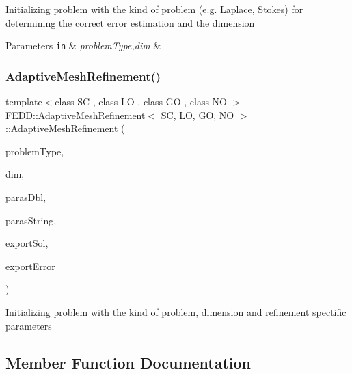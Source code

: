 Initializing problem with the kind of problem (e.\+g. Laplace, Stokes) for determining the correct error estimation and the dimension 
\begin{DoxyParams}[1]{Parameters}
\mbox{\tt in}  & {\em problem\+Type,dim} & \\
\hline
\end{DoxyParams}
\mbox{\label{classFEDD_1_1AdaptiveMeshRefinement_afbfd75b4f7579382147c6ca96f14b3b0}} 
\subsubsection{\texorpdfstring{Adaptive\+Mesh\+Refinement()}{AdaptiveMeshRefinement()}\hspace{0.1cm}{\footnotesize\ttfamily [4/4]}}
{\footnotesize\ttfamily template$<$class SC , class LO , class GO , class NO $>$ \\
\hyperlink{classFEDD_1_1AdaptiveMeshRefinement}{F\+E\+D\+D\+::\+Adaptive\+Mesh\+Refinement}$<$ SC, LO, GO, NO $>$\+::\hyperlink{classFEDD_1_1AdaptiveMeshRefinement}{Adaptive\+Mesh\+Refinement} (\begin{DoxyParamCaption}\item[{string}]{problem\+Type,  }\item[{int}]{dim,  }\item[{vec\+\_\+dbl\+\_\+\+Type}]{paras\+Dbl,  }\item[{vec\+\_\+string\+\_\+type}]{paras\+String,  }\item[{\hyperlink{classFEDD_1_1AdaptiveMeshRefinement_ac8cda8533e68f9049ede0208be2175d6}{Exporter\+Ptr\+\_\+\+Type}}]{export\+Sol,  }\item[{\hyperlink{classFEDD_1_1AdaptiveMeshRefinement_ac8cda8533e68f9049ede0208be2175d6}{Exporter\+Ptr\+\_\+\+Type}}]{export\+Error }\end{DoxyParamCaption})}

Initializing problem with the kind of problem, dimension and refinement spectific parameters 

\subsection{Member Function Documentation}
\mbox{\label{classFEDD_1_1AdaptiveMeshRefinement_a1dc2d35c4ddb08d1ffeacc66abf4da89}} 

